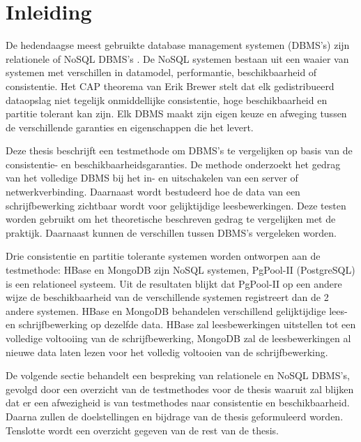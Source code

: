 \chapter{Inleiding}
De hedendaagse meest gebruikte database management systemen (DBMS's) zijn relationele of NoSQL DBMS's \cite{dbengine-ranking}. De NoSQL systemen bestaan uit een waaier van systemen met verschillen in datamodel, performantie, beschikbaarheid of consistentie. 
Het CAP theorema van Erik Brewer\cite{Brewer:2000:TRD:343477.343502} stelt dat elk gedistribueerd dataopslag niet tegelijk onmiddellijke consistentie, hoge beschikbaarheid en partitie tolerant kan zijn. Elk DBMS maakt zijn eigen keuze en afweging tussen de verschillende garanties en eigenschappen die het levert. 

Deze thesis beschrijft een testmethode om DBMS's te vergelijken op basis van de consistentie- en beschikbaarheidsgaranties. De methode onderzoekt het gedrag van het volledige DBMS bij het in- en uitschakelen van een server of netwerkverbinding. Daarnaast wordt bestudeerd hoe de data van een schrijfbewerking zichtbaar wordt voor gelijktijdige leesbewerkingen. Deze testen worden gebruikt om het theoretische beschreven gedrag te vergelijken met de praktijk. Daarnaast kunnen de verschillen tussen DBMS's vergeleken worden.

Drie consistentie en partitie tolerante systemen worden ontworpen aan de testmethode: HBase en MongoDB zijn NoSQL systemen, PgPool-II (PostgreSQL) is een relationeel systeem. Uit de resultaten blijkt dat PgPool-II op een andere wijze de beschikbaarheid van de verschillende systemen registreert dan de 2 andere systemen. HBase en MongoDB behandelen verschillend gelijktijdige lees- en schrijfbewerking op dezelfde data. HBase zal leesbewerkingen uitstellen tot een volledige voltooiing van de schrijfbewerking, MongoDB zal de leesbewerkingen al nieuwe data laten lezen voor het volledig voltooien van de schrijfbewerking. 

De volgende sectie behandelt een bespreking van relationele en NoSQL DBMS's, gevolgd door een overzicht van de testmethodes voor de thesis waaruit zal blijken dat er een afwezigheid is van testmethodes naar consistentie en beschikbaarheid. Daarna zullen de doelstellingen en bijdrage van de thesis geformuleerd worden. Tenslotte wordt een overzicht gegeven van de rest van de thesis. 


%
%

